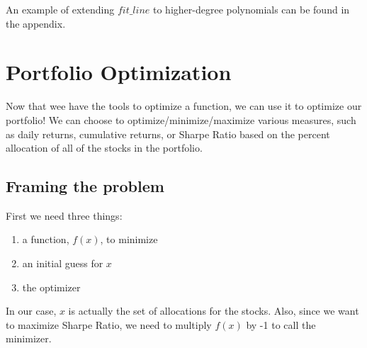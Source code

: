 \noindent An example of extending $fit\_line$ to higher-degree polynomials can be found in the appendix.

\section{Portfolio Optimization}
\noindent Now that wee have the tools to optimize a function, we can use it to optimize our portfolio! We can choose to optimize/minimize/maximize various measures, such as daily returns, cumulative returns, or Sharpe Ratio based on the percent allocation of all of the stocks in the portfolio.

\subsection{Framing the problem}
\noindent First we need three things:
\begin{enumerate}
\item a function, $f(x)$, to minimize
\item an initial guess for $x$
\item the optimizer
\end{enumerate}

\noindent In our case, $x$ is actually the set of allocations for the stocks. Also, since we want to maximize Sharpe Ratio, we need to multiply $f(x)$ by -1 to call the minimizer.